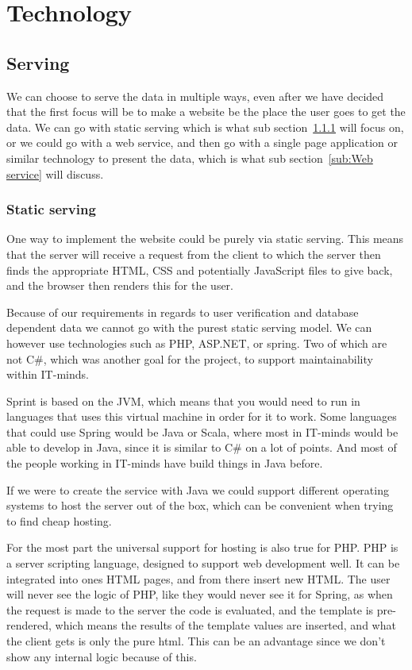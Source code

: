 \chapter{Technology}
\label{chap:Technology}

\section{Serving}
\label{sec:Serving}
We can choose to serve the data in multiple ways, even after we have decided that the first focus will be to make a website be the place the user goes to get the data. We can go with static serving which is what sub section~\ref{sub:Static serving} will focus on, or we could go with a web service, and then go with a single page application or similar technology to present the data, which is what sub section~\ref{sub:Web service} will discuss.

\subsection{Static serving}
\label{sub:Static serving}

One way to implement the website could be purely via static serving. This means that the server will receive a request from the client to which the server then finds the appropriate HTML, CSS and potentially JavaScript files to give back, and the browser then renders this for the user.

Because of our requirements in regards to user verification and database dependent data we cannot go with the purest static serving model. We can however use technologies such as PHP, ASP.NET, or spring. Two of which are not C\#, which was another goal for the project, to support maintainability within IT-minds.

Sprint is based on the JVM\cite{spring-framework}, which means that you would need to run in languages that uses this virtual machine in order for it to work. Some languages that could use Spring would be Java or Scala, where most in IT-minds would be able to develop in Java, since it is similar to C\# on a lot of points. And most of the people working in IT-minds have build things in Java before.

If we were to create the service with Java we could support different operating systems to host the server out of the box, which can be convenient when trying to find cheap hosting.

For the most part the universal support for hosting is also true for PHP. PHP is a server scripting language\cite{php-home}, designed to support web development well. It can be integrated into ones HTML pages, and from there insert new HTML. The user will never see the logic of PHP, like they would never see it for Spring, as when the request is made to the server the code is evaluated, and the template is pre-rendered, which means the results of the template values are inserted, and what the client gets is only the pure html. This can be an advantage since we don't show any internal logic because of this.

